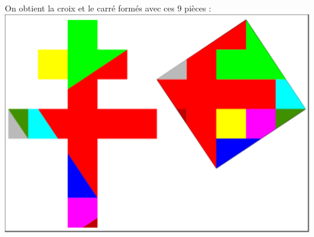 \documentclass[a4paper,11pt]{book}
\begin{document}
On obtient la croix et le carr\'e form\'es avec ces 9 pi\`eces :\\
\includegraphics[width=\textwidth]{puzzlecroix12}\\
\end{document}
